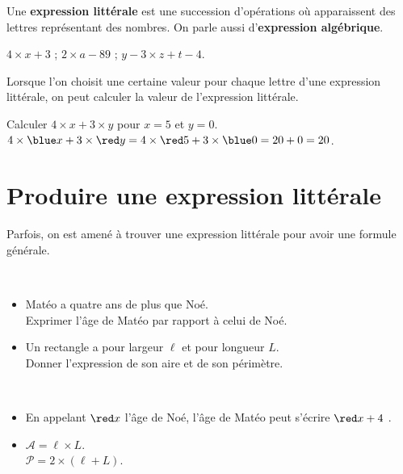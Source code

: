 \medskip

\begin{definition}
   Une {\bf expression littérale} est une succession d'opérations où apparaissent des lettres représentant des nombres. On parle aussi d'{\bf expression algébrique}.
\end{definition}

\begin{exemple}
   $4\times x+3$ \; ; \; $2\times a-89$ \; ; \; $y-3\times z+t-4$.
\end{exemple}

\bigskip

Lorsque l'on choisit une certaine valeur pour chaque lettre d'une expression littérale, on peut calculer la valeur de l'expression littérale.  

\begin{exemple}[0.5]
   Calculer $4\times x+3\times y$ pour $x=5$ et $y =0$. \\
   \correction
      $4\times{\blue x}+3\times{\red y} =4\times{\red 5}+3\times{\blue0} =20+0 =20$.
\end{exemple}


\section{Produire une expression littérale}

Parfois, on est amené à trouver une expression littérale pour avoir une formule générale.

\begin{exemple}[0.55]
\ \\ [-10mm]
   \begin{itemize}
      \item Matéo a quatre ans de plus que Noé. \\
         Exprimer l'âge de Matéo par rapport à celui de Noé.
      \item Un rectangle a pour largeur $\ell$ et pour longueur $L$. \\
         Donner l'expression de son aire et de son périmètre.
   \end{itemize}
   \correction
      \ \\ [-10mm]
      \begin{itemize}
         \item En appelant \og $\red x$ \fg{} l'âge de Noé, l'âge de Matéo peut s'écrire \og ${\red x}+4$ \fg.
         \item $\mathcal{A} =\ell\times L$. \\
         $\mathcal{P} =2\times(\ell+L)$.
      \end{itemize}
\end{exemple}

